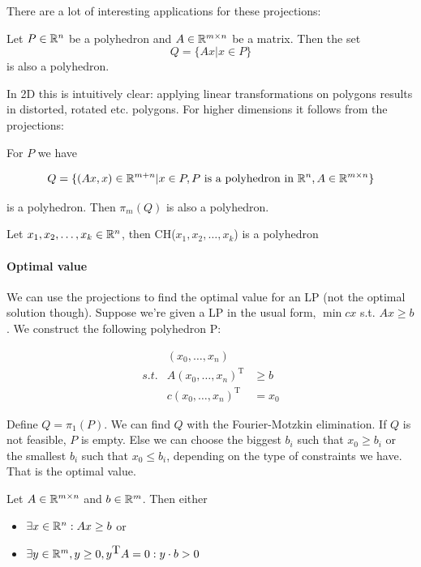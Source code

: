 There are a lot of interesting applications for these projections:

\begin{thm}\label{Thm:linTransPoly} Let $P\in \mathbb{R}^n$ be a polyhedron and $A\in \mathbb{R}^{m\times n}$ be a matrix. Then the set
\[Q=\{Ax|x\in P\}\]
is also a polyhedron.
\end{thm}

In 2D this is intuitively clear: applying linear transformations on polygons results in distorted, rotated etc. polygons. For higher dimensions it follows from the projections:

\begin{pr} For $P$ we have

\[Q=\{(Ax,x)\in \mathbb{R}^{m+n}| x\in P, P\text{ is a polyhedron in } \mathbb{R}^{n}, A \in \mathbb{R}^{m \times n}\}\]  %

is a polyhedron. Then $\pi_m(Q)$ is also a polyhedron.
\end{pr}

\begin{cor} Let $x_1,x_2,\ldots, x_k \in \mathbb{R}^n$, then CH($x_1,x_2,\ldots, x_k$) is a polyhedron\end{cor}

\paragraph*{Optimal value} We can use the projections to find the optimal value for an LP (not the optimal solution though). Suppose we're given a LP in the usual form, $\min cx$ s.t. $Ax\geq b$. We construct the following polyhedron P:

\begin{eqnarray*}
 & (x_0,\ldots,x_n) & \\
s.t. & A(x_0,\ldots,x_n)^{\mbox{T}} & \geq b \\
& c(x_0,\ldots,x_n)^{\mbox{T}} & = x_0
\end{eqnarray*}

Define $Q = \pi_1(P)$. We can find $Q$ with the Fourier-Motzkin elimination. If $Q$ is not feasible, $P$ is empty. Else we can choose the biggest $b_i$ such that $x_0\geq b_i$ or the smallest $b_i$ such that $x_0 \leq b_i$, depending on the type of constraints we have. That is the optimal value.

\begin{thm} Let $A\in \mathbb{R}^{m\times n}$ and $b\in \mathbb{R}^m$. Then either 
\begin{itemize}
\item $\exists x\in \mathbb{R}^n: Ax\geq b$ or
\item $\exists y\in \mathbb{R}^m, y\geq 0, y^{\mbox{T}}A=0: y\cdot b>0$
\end{itemize}
\end{thm}


